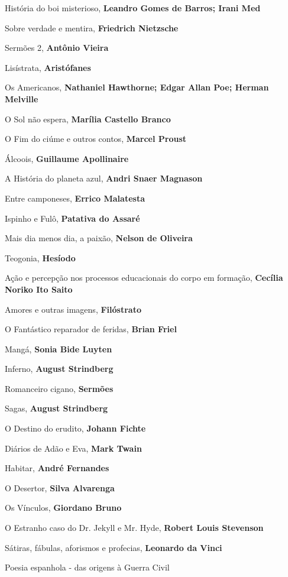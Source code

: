 \begin{multicols}{2}
\begin{enumerate}
{\item História do boi misterioso, \textbf{Leandro Gomes de Barros; Irani Med}
\item Sobre verdade e mentira, \textbf{Friedrich Nietzsche}
\item Sermões 2, \textbf{Antônio Vieira}
\item Lisístrata, \textbf{Aristófanes}
\item Os Americanos, \textbf{Nathaniel Hawthorne; Edgar Allan Poe; Herman Melville}
\item O Sol não espera, \textbf{Marília Castello Branco}
\item O Fim do ciúme e outros contos, \textbf{Marcel Proust}
\item Álcoois, \textbf{Guillaume Apollinaire}
\item A História do planeta azul, \textbf{Andri Snaer Magnason}
\item Entre camponeses, \textbf{Errico Malatesta}
\item Ispinho e Fulô, \textbf{Patativa do Assaré}
\item Mais dia menos dia, a paixão, \textbf{Nelson de Oliveira}
\item Teogonia, \textbf{Hesíodo}
\item Ação e percepção nos processos educacionais do corpo em formação, \textbf{Cecília Noriko Ito Saito}
\item Amores e outras imagens, \textbf{Filóstrato}
\item O Fantástico reparador de feridas, \textbf{Brian Friel}
\item Mangá, \textbf{Sonia Bide Luyten}
\item Inferno, \textbf{August Strindberg}
\item Romanceiro cigano, \textbf{Sermões}
\item Sagas, \textbf{August Strindberg}
\item O Destino do erudito, \textbf{Johann Fichte}
\item Diários de Adão e Eva, \textbf{Mark Twain}
\item Habitar, \textbf{André Fernandes}
\item O Desertor, \textbf{Silva Alvarenga}
\item Os Vínculos, \textbf{Giordano Bruno}
\item O Estranho caso do Dr. Jekyll e Mr. Hyde, \textbf{Robert Louis Stevenson}
\item Sátiras, fábulas, aforismos e profecias, \textbf{Leonardo da Vinci}
\item Poesia espanhola - das origens à Guerra Civil
}
\end{enumerate}
\end{multicols}
